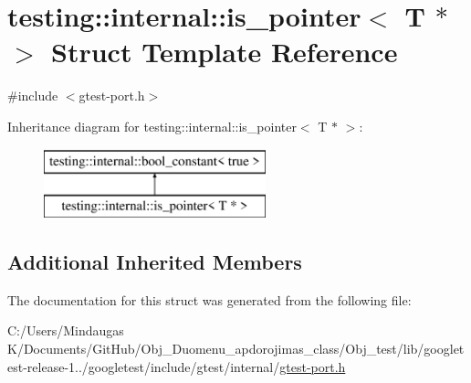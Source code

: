 \hypertarget{structtesting_1_1internal_1_1is__pointer_3_01_t_01_5_01_4}{}\section{testing\+::internal\+::is\+\_\+pointer$<$ T $\ast$ $>$ Struct Template Reference}
\label{structtesting_1_1internal_1_1is__pointer_3_01_t_01_5_01_4}


{\ttfamily \#include $<$gtest-\/port.\+h$>$}

Inheritance diagram for testing\+::internal\+::is\+\_\+pointer$<$ T $\ast$ $>$\+:\begin{figure}[H]
\begin{center}
\leavevmode
\includegraphics[height=2.000000cm]{de/d15/structtesting_1_1internal_1_1is__pointer_3_01_t_01_5_01_4}
\end{center}
\end{figure}
\subsection*{Additional Inherited Members}


The documentation for this struct was generated from the following file\+:\begin{DoxyCompactItemize}
\item 
C\+:/\+Users/\+Mindaugas K/\+Documents/\+Git\+Hub/\+Obj\+\_\+\+Duomenu\+\_\+apdorojimas\+\_\+class/\+Obj\+\_\+test/lib/googletest-\/release-\/1../googletest/include/gtest/internal/\mbox{\hyperlink{_obj__test_2lib_2googletest-release-1_88_81_2googletest_2include_2gtest_2internal_2gtest-port_8h}{gtest-\/port.\+h}}\end{DoxyCompactItemize}
